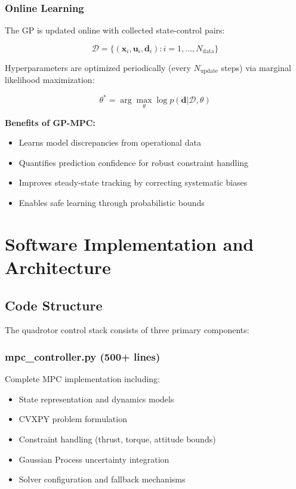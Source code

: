 \documentclass[journal]{IEEEtran}
\begin{document}
\subsubsection{Online Learning}

The GP is updated online with collected state-control pairs:

\begin{equation}
\mathcal{D} = \{(\mathbf{x}_i, \mathbf{u}_i, \mathbf{d}_i) : i = 1, \ldots, N_{\text{data}}\}
\label{eq:gp_dataset}
\end{equation}

Hyperparameters are optimized periodically (every $N_{\text{update}}$ steps) via marginal likelihood maximization:

\begin{equation}
\theta^* = \arg\max_{\theta} \log p(\mathbf{d} | \mathcal{D}, \theta)
\label{eq:gp_learning}
\end{equation}

\textbf{Benefits of GP-MPC:}
\begin{itemize}
    \item Learns model discrepancies from operational data
    \item Quantifies prediction confidence for robust constraint handling
    \item Improves steady-state tracking by correcting systematic biases
    \item Enables safe learning through probabilistic bounds
\end{itemize}

\section{Software Implementation and Architecture}\label{sec:implementation}

\subsection{Code Structure}

The quadrotor control stack consists of three primary components:

\subsubsection{mpc\_controller.py (500+ lines)}

Complete MPC implementation including:
\begin{itemize}
    \item State representation and dynamics models
    \item CVXPY problem formulation
    \item Constraint handling (thrust, torque, attitude bounds)
    \item Gaussian Process uncertainty integration
    \item Solver configuration and fallback mechanisms
\end{itemize}
\end{document}
